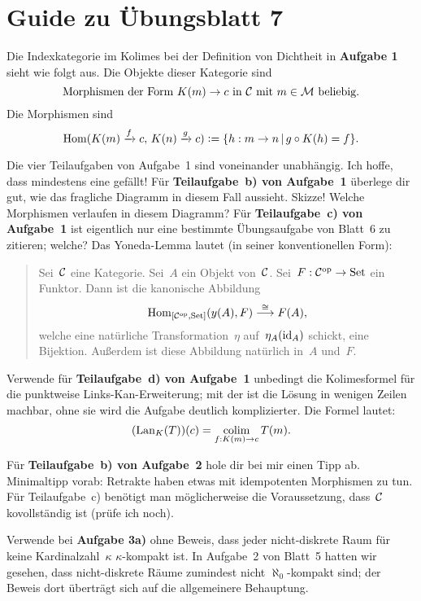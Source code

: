 \documentclass{uebblatt}
\begin{document}
\section*{Guide zu Übungsblatt 7}

Die Indexkategorie im Kolimes bei der Definition von Dichtheit in
\textbf{Aufgabe 1} sieht wie folgt aus. Die Objekte dieser Kategorie sind
\[ \text{Morphismen der Form~$K(m) \to c$ in~$\mathcal{C}$ mit~$m \in \mathcal{M}$ beliebig.} \]
Die Morphismen sind
\[ \mathrm{Hom}(K(m) \xrightarrow{f} c,\, K(n) \xrightarrow{g} c) \vcentcolon=
  \{ h : m \to n \,|\, g \circ K(h) = f \}. \]

Die vier Teilaufgaben von Aufgabe~1 sind voneinander unabhängig. Ich hoffe,
dass mindestens eine gefällt! Für \textbf{Teilaufgabe~b) von Aufgabe~1}
überlege dir gut, wie das fragliche Diagramm in diesem Fall aussieht. Skizze!
Welche Morphismen verlaufen in diesem Diagramm? Für \textbf{Teilaufgabe~c) von
Aufgabe~1} ist eigentlich nur eine bestimmte Übungsaufgabe von Blatt~6 zu
zitieren; welche? Das Yoneda-Lemma lautet (in seiner konventionellen Form):
\begin{quote}
Sei~$\mathcal{C}$ eine Kategorie. Sei~$A$ ein Objekt von~$\mathcal{C}$. Sei~$F : \mathcal{C}^{\mathrm{op}} \to \mathrm{Set}$
ein Funktor. Dann ist die kanonische Abbildung
\[ \mathrm{Hom}_{[\mathcal{C}^{\mathrm{op}},\mathrm{Set}]}(y(A), F) \stackrel{\cong}{\longrightarrow} F(A), \]
welche eine natürliche Transformation~$\eta$ auf~$\eta_A(\mathrm{id}_A)$ schickt, eine
Bijektion. Außerdem ist diese Abbildung natürlich in~$A$ und~$F$.
\end{quote}

Verwende für \textbf{Teilaufgabe~d) von Aufgabe~1} unbedingt die Kolimesformel
für die punktweise Links-Kan-Erweiterung; mit der ist die Lösung in wenigen
Zeilen machbar, ohne sie wird die Aufgabe deutlich komplizierter. Die Formel
lautet:
\[ (\mathrm{Lan}_K(T))(c) = \operatorname*{colim}_{f:K(m) \to c} T(m). \]

Für \textbf{Teilaufgabe~b) von Aufgabe~2} hole dir bei mir einen Tipp ab.
Minimaltipp vorab: Retrakte haben etwas mit idempotenten Morphismen zu tun.
Für Teilaufgabe~c) benötigt man möglicherweise die Voraussetzung, dass~$\mathcal{C}$
kovollständig ist (prüfe ich noch).

Verwende bei \textbf{Aufgabe 3a)} ohne Beweis, dass jeder nicht-diskrete Raum für keine
Kardinalzahl~$\kappa$ $\kappa$-kompakt ist. In Aufgabe~2 von Blatt~5 hatten wir
gesehen, dass nicht-diskrete Räume zumindest nicht $\aleph_0$-kompakt sind; der
Beweis dort überträgt sich auf die allgemeinere Behauptung.
\end{document}
